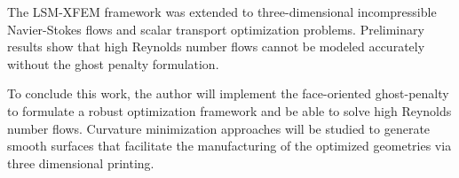 The LSM-XFEM framework was extended to three-dimensional incompressible Navier-Stokes flows and scalar transport optimization problems. Preliminary results show that high Reynolds number flows cannot be modeled accurately without the ghost penalty formulation.

To conclude this work, the author will implement the face-oriented ghost-penalty to formulate a robust optimization framework and be able to solve high Reynolds number flows. Curvature minimization approaches will be studied to generate smooth surfaces that facilitate the manufacturing of the optimized geometries via three dimensional printing.


% 


% 
% 

% 
